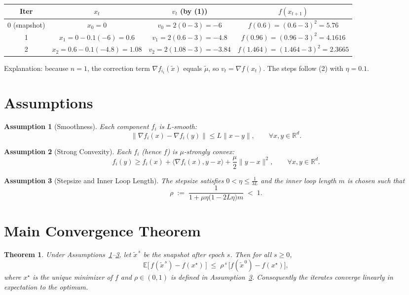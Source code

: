\documentclass{article}
\newtheorem{theorem}{Theorem}
\newtheorem{assumption}{Assumption}
\newcommand{\E}{\mathbb{E}}
\newcommand{\R}{\mathbb{R}}
\begin{document}
\begin{tabular}{c|c|c|c}
\textbf{Iter} & $x_t$ & $v_t$ (by (1)) & $f(x_{t+1})$ \\
\hline
0 (snapshot) & $x_0=0$ & $v_0=2(0-3)= -6$ & $f(0.6)= (0.6-3)^2=5.76$\\
1 & $x_1=0-0.1(-6)=0.6$ & $v_1=2(0.6-3)= -4.8$ & $f(0.96)= (0.96-3)^2=4.1616$\\
2 & $x_2=0.6-0.1(-4.8)=1.08$ & $v_2=2(1.08-3)= -3.84$ & $f(1.464)= (1.464-3)^2=2.3665$
\end{tabular}

\noindent
Explanation: because $n=1$, the correction term $\nabla f_{i_t}(\tilde{x})$ equals $\tilde{\mu}$, so $v_t=\nabla f(x_t)$. The steps follow (2) with $\eta=0.1$.

\section*{Assumptions}
\begin{assumption}[Smoothness]\label{ass:smooth}
Each component $f_i$ is $L$‑smooth:
\[
\|\nabla f_i(x)-\nabla f_i(y)\|\le L\|x-y\|,\qquad\forall x,y\in\R^d .
\]
\end{assumption}
\begin{assumption}[Strong Convexity]\label{ass:strong}
Each $f_i$ (hence $f$) is $\mu$‑strongly convex:
\[
f_i(y)\ge f_i(x)+\langle\nabla f_i(x),y-x\rangle+\frac{\mu}{2}\|y-x\|^2,\qquad\forall x,y\in\R^d .
\]
\end{assumption}
\begin{assumption}[Stepsize and Inner Loop Length]\label{ass:params}
The stepsize satisfies $0<\eta\le \frac{1}{3L}$ and the inner loop length $m$ is chosen such that
\[
\rho\;:=\;\frac{1}{1+\mu\eta\bigl(1-2L\eta\bigr)m}\;<\;1 .
\]
\end{assumption}

\section*{Main Convergence Theorem}
\begin{theorem}\label{thm:linear}
Under Assumptions~\ref{ass:smooth}--\ref{ass:params}, let $\tilde{x}^{\,s}$ be the snapshot after epoch $s$. Then for all $s\ge0$,
\[
\E\!\bigl[\,f(\tilde{x}^{\,s})-f(x^{\star})\,\bigr]\;\le\;\rho^{\,s}\,\bigl[f(\tilde{x}^{\,0})-f(x^{\star})\bigr],
\tag{3}
\]
where $x^{\star}$ is the unique minimizer of $f$ and $\rho\in(0,1)$ is defined in Assumption~\ref{ass:params}. Consequently the iterates converge linearly in expectation to the optimum.
\end{theorem}
\end{document}
